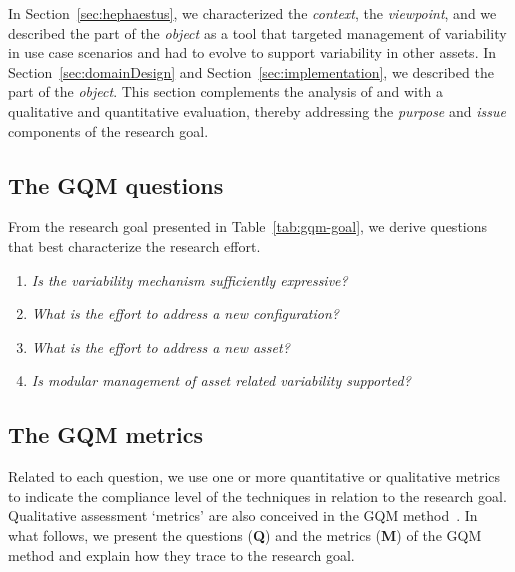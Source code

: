 In Section~\ref{sec:hephaestus}, we characterized the \emph{context}, the \emph{viewpoint}, and we described the \hp{} part of the \emph{object} as a tool that targeted management of variability in use case scenarios and had to evolve to support variability in other assets. In Section~\ref{sec:domainDesign} and Section~\ref{sec:implementation}, we described the \hpl{} part of the \emph{object}. This section complements the analysis of \hpl{} and \hp{} with a qualitative and quantitative evaluation, thereby addressing the \emph{purpose} and \emph{issue} components of the research goal.


\subsection{The GQM questions} 
\label{sec:q}

From the research goal presented in Table~\ref{tab:gqm-goal}, we derive questions that best characterize the \hpl{} research effort. 

\begin{enumerate}[Q1]
\item \emph{Is the variability mechanism sufficiently expressive?}
\item \emph{What is the effort to address a new configuration?}
\item \emph{What is the effort to address a new asset?}
\item \emph{Is modular management of asset related variability supported?}
\end{enumerate}


\subsection{The GQM metrics} 
\label{sec:m}

Related to each question, we use one or more quantitative or qualitative metrics to indicate the compliance level of the techniques in relation to the research goal. Qualitative assessment `metrics' are also conceived in the GQM method~\cite{gqm}.  In what follows, we present the questions (\textbf{Q}) and the metrics (\textbf{M}) of the GQM method and explain how they trace to the research goal.

